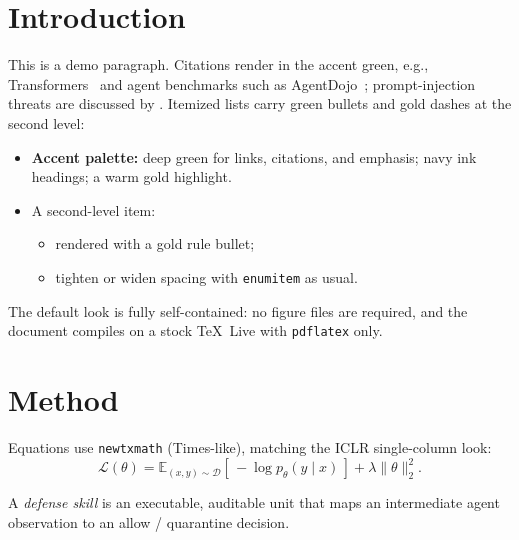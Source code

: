 \documentclass[11pt]{article}
\begin{document}
\NAISSMakeTitle
\NAISSMakeAbstract

\section{Introduction}
\label{sec:intro}

This is a demo paragraph. Citations render in the accent green, e.g.,
Transformers~\citep{vaswani2017attention} and agent benchmarks such as
AgentDojo~\citep{debenedetti2024agentdojo}; prompt-injection threats are
discussed by \citet{greshake2023promptinjection}. Itemized lists carry green
bullets and gold dashes at the second level:

\begin{itemize}
  \item \textbf{Accent palette:} \textcolor{NAISSGreen}{deep green} for
    links, citations, and emphasis; \textcolor{NAISSInk}{navy ink} headings;
    a \textcolor{NAISSGold!85!black}{warm gold} highlight.
  \item A second-level item:
    \begin{itemize}
      \item rendered with a gold rule bullet;
      \item tighten or widen spacing with \texttt{enumitem} as usual.
    \end{itemize}
\end{itemize}

\begin{naissgoldbox}[Takeaway]
The default look is fully self-contained: no figure files are required, and
the document compiles on a stock TeX~Live with \texttt{pdflatex} only.
\end{naissgoldbox}

\section{Method}
\label{sec:method}

Equations use \texttt{newtxmath} (Times-like), matching the ICLR
single-column look:
\begin{equation}
  \mathcal{L}(\theta) = \mathbb{E}_{(x,y)\sim\mathcal{D}}
  \left[\, -\log p_\theta(y \mid x) \,\right] + \lambda \lVert\theta\rVert_2^2 .
\end{equation}

\begin{definition}
A \emph{defense skill} is an executable, auditable unit that maps an
intermediate agent observation to an allow / quarantine decision.
\end{definition}
\end{document}
